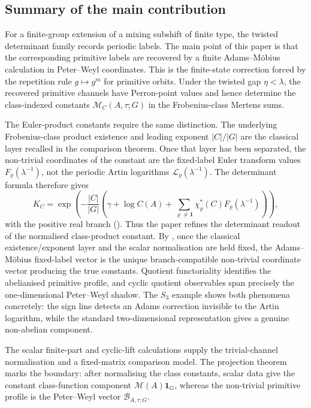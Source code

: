 \documentclass[11pt,a4paper]{amsart}
\theoremstyle{plain}
\theoremstyle{definition}
\theoremstyle{remark}
\begin{document}
\subsection{Summary of the main contribution}

For a finite-group extension of a mixing subshift of finite type, the
twisted determinant family records periodic labels. The main point of
this paper is that the corresponding primitive labels are recovered by a
finite Adams--M\"obius calculation in Peter--Weyl coordinates. This is
the finite-state correction forced by the repetition rule
\(g\mapsto g^m\) for primitive orbits. Under the twisted gap
\(\eta<\lambda\), the recovered primitive channels have Perron-point
values and hence determine the class-indexed constants
\(\mathcal M_C(A,\tau;G)\) in the Frobenius-class Mertens sums.

The Euler-product constants require the same distinction. The underlying
Frobenius-class product existence and leading exponent \(|C|/|G|\) are the
classical layer recalled in the comparison theorem. Once that layer has been
separated, the non-trivial coordinates of the constant are the fixed-label Euler transform values
\(F_\varrho(\lambda^{-1})\), not the periodic Artin logarithms
\(\mathcal L_\varrho(\lambda^{-1})\). The determinant formula therefore
gives
\[
  K_C=
  \exp\!\left(
    -\frac{|C|}{|G|}
    \left(
      \gamma+\log C(A)
      +\sum_{\varrho\neq\mathbf1}
        \chi_\varrho^\ast(C)F_\varrho(\lambda^{-1})
    \right)
  \right),
\]
with the positive real branch
(). Thus the paper refines the determinant readout of the normalised class-product constant.  By
, once the classical
existence/exponent layer and the scalar normalisation are held fixed, the
Adams--M\"obius fixed-label vector is the unique branch-compatible
non-trivial coordinate vector producing the true constants. Quotient
functoriality identifies the
abelianised primitive profile, and cyclic quotient observables span
precisely the one-dimensional Peter--Weyl shadow. The \(S_3\) example
shows both phenomena concretely: the sign line detects an Adams
correction invisible to the Artin logarithm, while the standard
two-dimensional representation gives a genuine non-abelian component.

The scalar finite-part and cyclic-lift calculations supply the
trivial-channel normalisation and a fixed-matrix comparison model. The
projection theorem
 marks the boundary:
after normalising the class constants, scalar data give the constant
class-function component \(\mathcal M(A)\mathbf 1_G\), whereas the
non-trivial primitive profile is the Peter--Weyl vector
\(\mathcal B_{A,\tau;G}\).
\end{document}
